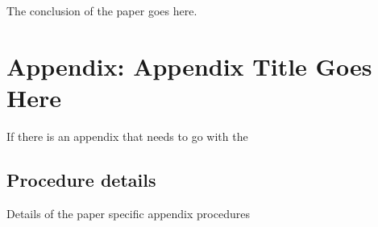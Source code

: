The conclusion of the paper goes here.

\autocite{zieglerLecturesPolytopes1995}

\printbibliography[heading=subbibnumbered]


% 
%     

\section{Appendix: Appendix Title Goes Here}
If there is an appendix that needs to go with the 

\subsection{Procedure details}
Details of the paper specific appendix procedures

